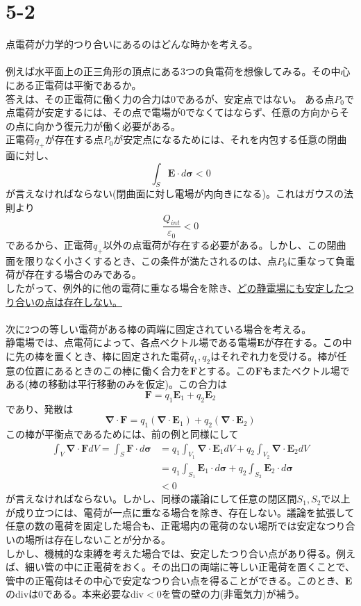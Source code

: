 \documentclass{jsarticle}
\begin{document}
\section*{5-2}
\noindent
点電荷が力学的つり合いにあるのはどんな時かを考える。\\
\\
例えば水平面上の正三角形の頂点にある3つの負電荷を想像してみる。その中心にある正電荷は平衡であるか。\\
答えは、その正電荷に働く力の合力は0であるが、安定点ではない。
ある点\(P_{0}\)で点電荷が安定するには、その点で電場が0でなくてはならず、任意の方向からその点に向かう復元力が働く必要がある。\\
正電荷\(q_{+}\)が存在する点\(P_{0}\)が安定点になるためには、それを内包する任意の閉曲面に対し、
\[\int_{S}\bm{E}\cdot d\bm{\sigma}<0\]
が言えなければならない(閉曲面に対し電場が内向きになる)。これはガウスの法則より
\[\frac{Q_{int}}{\varepsilon_{0}}<0\]
であるから、正電荷\(q_{+}\)以外の点電荷が存在する必要がある。しかし、この閉曲面を限りなく小さくするとき、この条件が満たされるのは、点\(P_{0}\)に重なって負電荷が存在する場合のみである。\\
したがって、例外的に他の電荷に重なる場合を除き、\underline{どの静電場にも安定したつり合いの点は存在しない。}
\\
\\
次に2つの等しい電荷がある棒の両端に固定されている場合を考える。\\
静電場では、点電荷によって、各点ベクトル場である電場\(\bm{E}\)が存在する。この中に先の棒を置くとき、棒に固定された電荷\(q_{1},q_{2}\)はそれぞれ力を受ける。棒が任意の位置にあるときのこの棒に働く合力を\(\bm{F}\)とする。この\(\bm{F}\)もまたベクトル場である(棒の移動は平行移動のみを仮定)。この合力は
\[\bm{F}=q_{1}\bm{E}_{1}+q_{2}\bm{E}_{2}\]
であり、発散は
\[\bm{\nabla}\cdot\bm{F}=q_{1}(\bm{\nabla}\cdot\bm{E}_{1})+q_{2}(\bm{\nabla}\cdot\bm{E}_{2})\]
この棒が平衡点であるためには、前の例と同様にして
\begin{align*}
\int_{V}\bm{\nabla}\cdot\bm{F}dV=\int_{S}\bm{F}\cdot d\bm{\sigma}&=q_{1}\int_{V_{1}}\bm{\nabla}\cdot\bm{E}_{1}dV+q_{2}\int_{V_{2}}\bm{\nabla}\cdot\bm{E}_{2}dV\\
&=q_{1}\int_{S_{1}}\bm{E}_{1}\cdot d\bm{\sigma}+q_{2}\int_{S_{2}}\bm{E}_{2}\cdot d\bm{\sigma}\\&<0
\end{align*}
が言えなければならない。しかし、同様の議論にして任意の閉区間\(S_{1},S_{2}\)で以上が成り立つには、電荷が一点に重なる場合を除き、存在しない。議論を拡張して任意の数の電荷を固定した場合も、正電場内の電荷のない場所では安定なつり合いの場所は存在しないことが分かる。\\
しかし、機械的な束縛を考えた場合では、安定したつり合い点があり得る。例えば、細い管の中に正電荷をおく。その出口の両端に等しい正電荷を置くことで、管中の正電荷はその中心で安定なつり合い点を得ることができる。このとき、\(\bm{E}\)のdivは0である。本来必要なdiv\(<0\)を管の壁の力(非電気力)が補う。
\newpage
\end{document}
